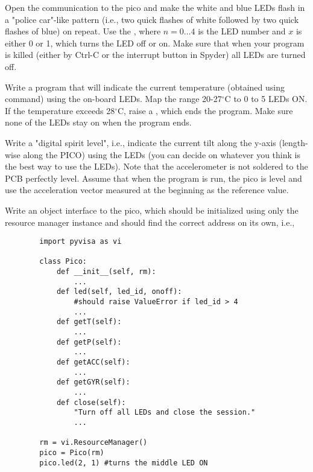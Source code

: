 \begin{exercise}
    Open the communication to the pico and make the white and blue LEDs flash in a "police car"-like pattern (i.e., two quick flashes of white followed by two quick flashes of blue) on repeat. Use the , where $n=0\dots 4$ is the LED number and $x$ is either 0 or 1, which turns the LED off or on. Make sure that when your program is killed (either by Ctrl-C or the interrupt button in Spyder) all LEDs are turned off.
\end{exercise}

\begin{exercise}
    Write a program that will indicate the current temperature (obtained using  command) using the on-board LEDs. Map the range 20-27$^\circ$C to 0 to 5 LEDs ON. If the temperature exceeds 28$^\circ$C, raise a , which ends the program. Make sure none of the LEDs stay on when the program ends.
\end{exercise}

\begin{exercise}
    Write a "digital spirit level", i.e., indicate the current tilt along the y-axis (length-wise along the PICO) using the LEDs (you can decide on whatever you think is the best way to use the LEDs). Note that the accelerometer is not soldered to the PCB perfectly level. Assume that when the program is run, the pico is level and use the acceleration vector measured at the beginning as the reference value.
\end{exercise}

\begin{exercise}
    Write an object interface to the pico, which should be initialized using only the resource manager instance and should find the correct address on its own, i.e.,
    \begin{lstlisting}
        import pyvisa as vi

        class Pico:
            def __init__(self, rm):
                ...
            def led(self, led_id, onoff):
                #should raise ValueError if led_id > 4
                ...
            def getT(self):
                ...
            def getP(self):
                ...
            def getACC(self):
                ...
            def getGYR(self):
                ...
            def close(self):
                "Turn off all LEDs and close the session."
                ...
        
        rm = vi.ResourceManager()
        pico = Pico(rm)
        pico.led(2, 1) #turns the middle LED ON
    \end{lstlisting}
\end{exercise}

